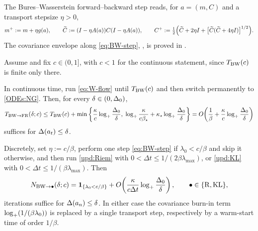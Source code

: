 The Bures--Wasserstein forward--backward step reads, for $a=(m,C)$ and a transport stepsize
$\eta>0$,
\begin{equation}\label{eq:BW-step}
    m^+:=m+\eta g(a),
    \qquad
    \widetilde C:=(I-\eta A(a))C(I-\eta A(a)),
    \qquad
    C^+:=\tfrac12\Bigl(\widetilde C+2\eta I+\bigl[\widetilde C(\widetilde C+4\eta I)\bigr]^{1/2}\Bigr).
\end{equation}
The covariance envelope along \eqref{eq:BW-step}, , is proved in
.

\begin{theorem}\label{thm:burnin-BW}
    Assume  and fix $c\in(0,1]$, with $c<1$ for the continuous
    statement, since $T_{\mathrm{BW}}(c)$ is finite only there.

    In continuous time, run \eqref{eq:W-flow} until $T_{\mathrm{BW}}(c)$ and then switch permanently to
    \eqref{ODEs:NG}. Then, for every $\delta\in(0,\Delta_0)$,
    \begin{equation*}
        T_{\mathrm{BW}\to\mathrm{FR}}(\delta;c)
        \leq
        T_{\mathrm{BW}}(c)
        +\min\left\{
            \frac\kappa c\log_+\frac{\Delta_0}\delta,\;
            \log_+\frac\kappa{c\beta_\star}+\kappa_\star\log_+\frac{\Delta_0}\delta
        \right\}
        =
        O\!\left(\frac1\beta+\frac\kappa c\log_+\frac{\Delta_0}\delta\right)
    \end{equation*}
    suffices for $\Delta(a_t)\leq\delta$.

    Discretely, set $\eta:=c/\beta$, perform one step \eqref{eq:BW-step} if
    $\lambda_0<c/\beta$ and skip it otherwise, and then run \eqref{upd:Riem} with
    $0<\Delta t\leq1/(2\beta\lambda_{\max})$, or \eqref{upd:KL} with
    $0<\Delta t\leq1/(\beta\lambda_{\max})$. Then
    \begin{equation*}
        N_{\mathrm{BW}\to\bullet}(\delta;c)
        =
        \mathbf1_{\{\lambda_0<c/\beta\}}
        +O\!\left(\frac\kappa{c\Delta t}\log_+\frac{\Delta_0}\delta\right),
        \qquad \bullet\in\{\mathrm{R},\mathrm{KL}\},
    \end{equation*}
    iterations suffice for $\Delta(a_n)\leq\delta$. In either case the covariance burn-in term
    $\log_+(1/(\beta\lambda_0))$ is replaced by a single transport step, respectively by a
    warm-start time of order $1/\beta$.
\end{theorem}

